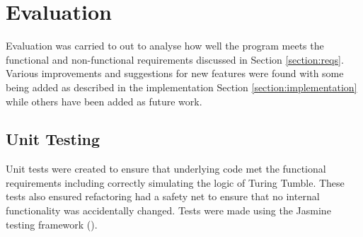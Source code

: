\documentclass{l4proj}
\begin{document}
\chapter{Evaluation}
\label{section:evaluation}
Evaluation was carried to out to analyse how well the program meets the functional and non-functional requirements discussed in Section \ref{section:reqs}. Various improvements and suggestions for new features were found with some being added as described in the implementation Section \ref{section:implementation} while others have been added as future work. 

\section{Unit Testing}
Unit tests were created to ensure that underlying code met the functional requirements including correctly simulating the logic of Turing Tumble. These tests also ensured refactoring had a safety net to ensure that no internal functionality was accidentally changed. Tests were made using the Jasmine testing framework (\cite{jasmine}). 

\end{document}
